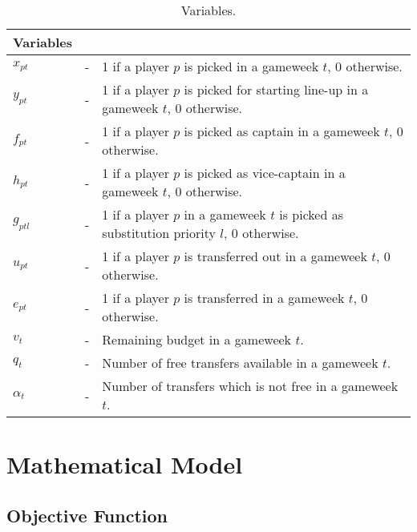 \begin{table}[H]
\tabcolsep=0.11cm
\centering
\caption{Variables.}
\begin{tabular}{@{}lll@{}}
\toprule
Variables    &   &                                                                                                    \\ \midrule
${x_{pt}}$   & - & 1 if a player $p$ is picked in a gameweek $t$, 0 otherwise.                                        \\
$y_{pt}$     & - & 1 if a player $p$ is picked for starting line-up in a gameweek $t$, 0 otherwise.                    \\
$f_{pt}$     & - & 1 if a player $p$ is picked as captain in a gameweek $t$, 0 otherwise.                             \\
$h_{pt}$     & - & 1 if a player $p$ is picked as vice-captain in a gameweek $t$, 0 otherwise.                         \\
$g_{ptl}$    & - & 1 if a player $p$ in a gameweek $t$ is picked as substitution priority $l$, 0 otherwise. \\
$u_{pt}$     & - & 1 if a player $p$ is transferred out in a gameweek $t$, 0 otherwise.                               \\
$e_{pt}$     & - & 1 if a player $p$ is transferred in a gameweek $t$, 0 otherwise.                                   \\
$v_{t}$      & - & Remaining budget in a gameweek $t$.                                                                \\
$q_{t}$      & - & Number of  free transfers available in a gameweek $t$.                                             \\
$\alpha_{t}$ & - & Number of transfers which is not free in a gameweek $t$.                                      \\ \bottomrule
\end{tabular}
\end{table}
   
\section{Mathematical Model} \label{mathematical_model}

\subsection{Objective Function}

